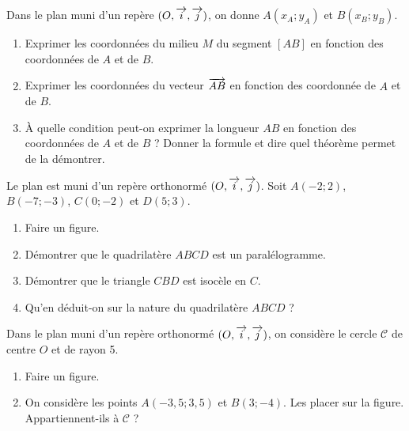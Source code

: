 \documentclass[a4paper,11pt,DIV15,BCOR0mm]{scrartcl}
\begin{document}
\begin{exercice}[Cours]
Dans le plan muni d'un repère $(O,\overrightarrow{i},\overrightarrow{j})$,
on donne $A(x_A;y_A)$ et $B(x_B;y_B)$.
\begin{enumerate}
  \item Exprimer les coordonnées du milieu $M$
  du segment $[AB]$ en fonction des coordonnées de 
  $A$ et de $B$.
  \item Exprimer les coordonnées du vecteur $\overrightarrow{AB}$
  en fonction des coordonnée  de $A$ et de $B$.
  \item À quelle  condition peut-on exprimer la longueur 
  $AB$ en fonction des coordonnées de $A$ et de $B$ ?
  Donner la formule et dire quel théorème permet de la démontrer.
\end{enumerate}
\end{exercice}

\begin{exercice}
 Le plan est muni d'un repère orthonormé $(O,\overrightarrow{i},\overrightarrow{j})$.
Soit $A(-2;2)$, $B(-7;-3)$, $C(0;-2)$ et $D(5;3)$.
\begin{enumerate}
 \item Faire un figure.
 \item Démontrer que le quadrilatère $ABCD$ est un paralélogramme.
 \item Démontrer que le triangle $CBD$ est isocèle en $C$.
 \item Qu'en déduit-on sur la nature du quadrilatère $ABCD$ ?
\end{enumerate}
\end{exercice}

\begin{exercice}
Dans le plan muni d'un repère orthonormé $(O,\overrightarrow{i},\overrightarrow{j})$,
on considère le cercle $\mathcal{C}$ de centre
$O$ et de rayon 5.
\begin{enumerate}
 \item Faire un figure.
 \item On considère les points $A(-3,5;3,5)$ et $B(3;-4)$. Les placer sur la figure.
Appartiennent-ils à $\mathcal{C}$ ?
\end{enumerate}
\end{exercice}
\end{document}
